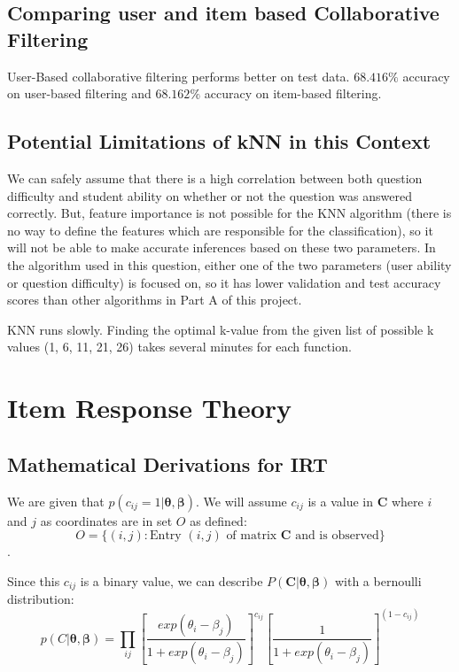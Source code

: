 \documentclass{article}
\begin{document}
    \subsection{Comparing user and item based Collaborative Filtering}
    User-Based collaborative filtering performs better on test data. $68.416\%$ accuracy on user-based filtering and $68.162\%$ accuracy on item-based filtering.

    \subsection{Potential Limitations of kNN in this Context}
    We can safely assume that there is a high correlation between both question difficulty and student ability on whether or not the question was answered correctly. But, feature importance is not possible for the KNN algorithm (there is no way to define the features which are responsible for the classification), so it will not be able to make accurate inferences based on these two parameters. In the algorithm used in this question, either one of the two parameters (user ability or question difficulty) is focused on, so it has lower validation and test accuracy scores than other algorithms in Part A of this project. 

    KNN runs slowly. Finding the optimal k-value from the given list of possible k values ({1, 6, 11, 21, 26}) takes several minutes for each function.

    


    \pagebreak

    \section{Item Response Theory}
    \subsection{Mathematical Derivations for IRT}
    We are given that $p(c_{ij} = 1 \vert \bm{\theta}, \bm{\beta})$. We will assume $c_{ij}$ is a value in $\bm{C}$ where $i$ and $j$ as coordinates are in set $O$ as defined:
    \[ O = \{(i,j): \text{Entry $(i,j)$ of matrix $\bm{C}$ and is observed}\} \].

    Since this $c_{ij}$ is a binary value, we can describe $P(\bm{C} \vert \bm{\theta}, \bm{\beta})$ with a bernoulli distribution:
    \[p(C \vert \bm{\theta}, \bm{\beta}) = \prod_{ij}[\frac{exp(\theta_{i} - \beta_{j})}{1+exp(\theta_{i} - \beta_{j})}]^{c_{ij}}[\frac{1}{1 + exp(\theta_{i} - \beta_{j})}]^{(1-c_{ij})}\]
\end{document}
